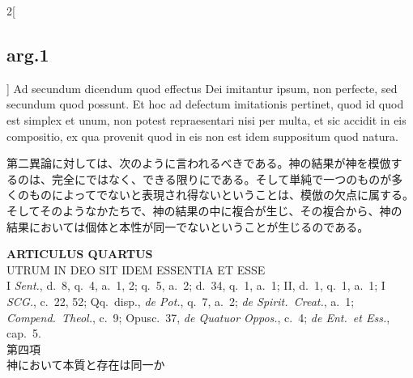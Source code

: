 \documentclass[paper=a4paper,fontsize=10pt,jafontsize=9pt,titlepage]{jlreq}
\begin{document}
\begin{paracol}{2}[\subsection{arg.1}]
Ad secundum dicendum quod effectus Dei imitantur ipsum, non perfecte,
sed secundum quod possunt. Et hoc ad defectum imitationis pertinet,
quod id quod est simplex et unum, non potest repraesentari nisi per
multa, et sic accidit in eis compositio, ex qua provenit quod in eis
non est idem suppositum quod natura.

\switchcolumn

第二異論に対しては、次のように言われるべきである。神の結果が神を模倣す
るのは、完全にではなく、できる限りにである。そして単純で一つのものが多
くのものによってでないと表現され得ないということは、模倣の欠点に属する。
そしてそのようなかたちで、神の結果の中に複合が生じ、その複合から、神の
結果においては個体と本性が同一でないということが生じるのである。

\end{paracol}


\newpage
{}
{}
\setcounter{section}{4}
\setcounter{subsection}{0}

\begin{center}
 {\Large {\bfseries ARTICULUS QUARTUS}}\\
 {\large UTRUM IN DEO SIT IDEM ESSENTIA ET ESSE}\\
 {\footnotesize I \textit{Sent.}, d.~8, q.~4, a.~1, 2; q.~5, a.~2;
 d.~34, q.~1, a.~1; II, d.~1, q.~1, a.~1; I \textit{SCG.}, c.~22, 52;
 Qq.~disp., \textit{de Pot.}, q.~7, a.~2; \textit{de Spirit.~Creat.},
 a.~1; \textit{Compend.~Theol.}, c.~9; Opusc.~37, \textit{de Quatuor
 Oppos.}, c.~4; \textit{de Ent.~et Ess.}, cap.~5.}\\
{\Large 第四項\\神において本質と存在は同一か}
\end{center}
\end{document}
